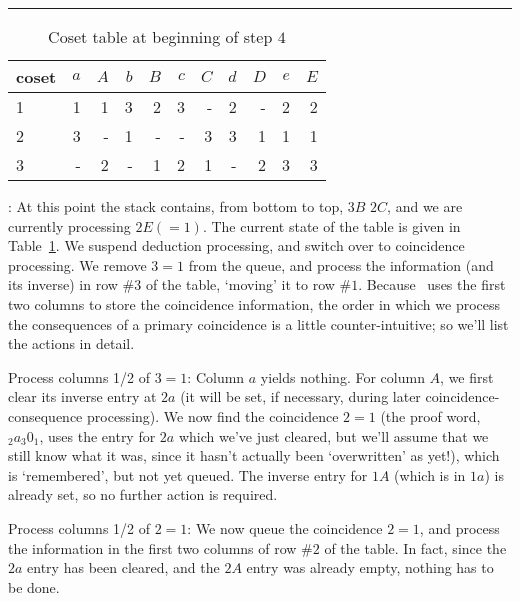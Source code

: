 \begin{table}
\hrule
\caption{Coset table at beginning of step $4$}
\label{tab:step4}
\smallskip
\renewcommand{\arraystretch}{0.875}
\begin{tabular*}{\textwidth}{@{\extracolsep{\fill}}lrrrrrrrrrr} 
\hline\hline
coset & $a$ & $A$ & $b$ & $B$ & $c$ & $C$ & $d$ & $D$ & $e$ & $E$ \\ 
\hline
 1 & 1 & 1 & 3 & 2 & 3 & - & 2 & - & 2 & 2 \\
 2 & 3 & - & 1 & - & - & 3 & 3 & 1 & 1 & 1 \\
 3 & - & 2 & - & 1 & 2 & 1 & - & 2 & 3 & 3 \\
\hline\hline
\end{tabular*}
\end{table}

:
At this point the stack contains, from bottom to top, $3B$ \amp $2C$, and
  we are currently processing $2E(=1)$.
The current state of the table is given in Table~\ref{tab:step4}.
We suspend deduction processing, and switch over to coincidence processing.
We remove $3=1$ from the queue, and process the information (and its
  inverse) in row \#$3$ of the table, `moving' it to row \#$1$.
Because \ace\ uses the first two columns to store the coincidence
  information, the order in which we process the consequences of a primary
  coincidence is a little counter-intuitive; so we'll list the actions
  in detail.

Process columns 1/2 of $3=1$:
Column $a$ yields nothing.
For column $A$, we first clear its inverse entry at $2a$ (it will be set,
  if necessary, during later coincidence-consequence processing).
We now find the coincidence $2=1$ (the proof word, $_2 a_3 0_1$, uses
  the entry for $2a$ which we've just cleared, but we'll assume that we
  still know what it was, since it hasn't actually been `overwritten'
  as yet!), which is `remembered'\kern-1.5pt, but not yet queued.
The inverse entry for $1A$ (which is in $1a$) is already set, so no
  further action is required.

Process columns 1/2 of $2=1$:
We now queue the coincidence $2=1$, and process the information in the
  first two columns of row \#$2$ of the table.
In fact, since the $2a$ entry has been cleared, and the $2A$ entry was
  already empty, nothing has to be done.

